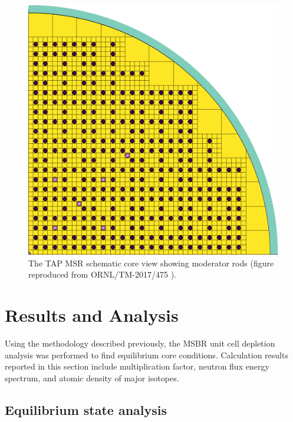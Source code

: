 \documentclass{anstrans}
\begin{document}
\begin{figure}[htbp!] %
        \centering
        \includegraphics[width=\linewidth]{tap_plan_view.png}
        \caption{The \gls{TAP} \gls{MSR} schematic core view showing moderator 
        rods (figure reproduced from ORNL/TM-2017/475 
        \cite{betzler_assessment_2017}).}
        \label{fig:zoneI}
\end{figure}


\section{Results and Analysis}

Using the methodology described previously, the \gls{MSBR} unit cell depletion 
analysis was performed to find equilibrium core conditions. Calculation results reported 
in this section include multiplication factor, neutron flux energy 
spectrum, and atomic density of major isotopes.

\subsection{Equilibrium state analysis}
\end{document}
